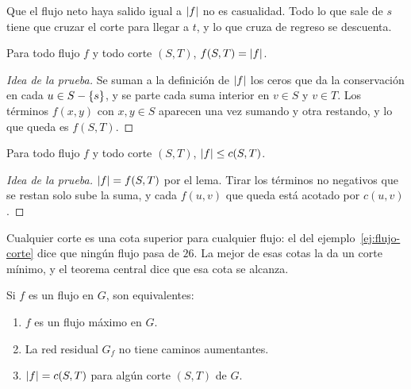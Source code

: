\documentclass[11pt,letterpaper]{article}
\begin{document}
Que el flujo neto haya salido igual a $\left\lvert f \right\rvert$ no es casualidad. Todo
lo que sale de $s$ tiene que cruzar el corte para llegar a $t$, y lo
que cruza de regreso se descuenta.

\begin{lema}\label{lem:flujo-neto-corte}
  Para todo flujo $f$ y todo corte $(S, T)$, $f(S, T) = \left\lvert f \right\rvert$.
\end{lema}

\begin{proof}[Idea de la prueba]
  Se suman a la definición de $\left\lvert f \right\rvert$ los ceros que da la
  conservación en cada $u \in S - \left\{ s \right\}$, y se parte cada suma
  interior en $v \in S$ y $v \in T$. Los términos $f(x, y)$ con
  $x, y \in S$ aparecen una vez sumando y otra restando, y lo que queda
  es $f(S, T)$.
\end{proof}

\begin{corolario}\label{cor:flujo-cota}
  Para todo flujo $f$ y todo corte $(S, T)$, $\left\lvert f \right\rvert \le c(S, T)$.
\end{corolario}

\begin{proof}[Idea de la prueba]
  $\left\lvert f \right\rvert = f(S, T)$ por el lema. Tirar los términos no negativos
  que se restan solo sube la suma, y cada $f(u, v)$ que queda está
  acotado por $c(u, v)$.
\end{proof}

Cualquier corte es una cota superior para cualquier flujo: el del
ejemplo~\ref{ej:flujo-corte} dice que ningún flujo pasa de $26$. La
mejor de esas cotas la da un corte mínimo, y el teorema central dice
que esa cota se alcanza.

\begin{teorema}\label{teo:flujo-corte}
  Si $f$ es un flujo en $G$, son equivalentes:
  \begin{enumerate}
    \item $f$ es un flujo máximo en $G$.
    \item La red residual $G_f$ no tiene caminos aumentantes.
    \item $\left\lvert f \right\rvert = c(S, T)$ para algún corte $(S, T)$ de $G$.
  \end{enumerate}
\end{teorema}
\end{document}
